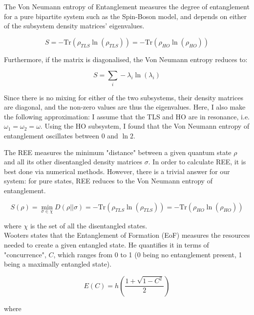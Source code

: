 \documentclass[12pt,a4paper]{article}
\begin{document}
The Von Neumann entropy of Entanglement\cite{DerivationVNEntropy} measures the degree of entanglement for a pure bipartite system such as the Spin-Boson model, and depends on either of the subsystem density matrices' eigenvalues. 

\begin{equation}
    S = -\text{Tr}(\rho_{TLS}\ln({\rho_{TLS}})) = -\text{Tr}(\rho_{HO}\ln({\rho_{HO}}))
\end{equation}

Furthermore, if the matrix is diagonalised, the Von Neumann entropy reduces to:

\begin{equation}
    S = \sum_i -\lambda_i\ln({\lambda_i})
\end{equation}

Since there is no mixing for either of the two subsystems, their density matrices are diagonal, and the non-zero values are thus the eigenvalues. Here, I also make the following approximation\cite{Bhattacharya2LSHO_Damping}: I assume that the TLS and HO are in resonance, i.e. $\omega_1=\omega_2=\omega$. Using the HO subsystem, I found that the Von Neumann entropy of entanglement oscillates between $0$ and $\ln{2}$.

The REE measures the minimum "distance" between a given quantum state $\rho$ and all its other disentangled density matrices $\sigma$\cite{GeneratingREE}. In order to calculate REE, it is best done via numerical methods. However, there is a trivial answer for our system\cite{OverviewREE}: for pure states, REE reduces to the Von Neumann entropy of entanglement.

\begin{equation}
    S(\rho) = \min_{\sigma \in \chi}  D(\rho||\sigma) =-\text{Tr}(\rho_{TLS}\ln({\rho_{TLS}})) = -\text{Tr}(\rho_{HO}\ln({\rho_{HO}}))
\end{equation}

where $\chi$ is the set of all the disentangled states.
\\
Wooters states\cite{...} that the Entanglement of Formation (EoF) measures the resources needed to create a given entangled state. He quantifies it in terms of "concurrence", $C$, which ranges from 0 to 1 (0 being no entanglement present, 1 being a maximally entangled state). 

\begin{equation}
    E(C) = h(\frac{1+\sqrt{1-C^2}}{2})
\end{equation}

where 
\end{document}
